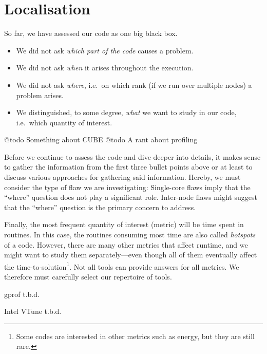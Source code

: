 \chapter{Localisation}
\label{capter:high-level:localisation}

So far, we have assessed our code as one big black box.

\begin{itemize}
  \item We did not ask \emph{which part of the code} causes a problem. 
  \item We did not ask \emph{when} it arises throughout the execution.
  \item We did not ask \emph{where}, i.e.~on which rank (if we run over multiple
  nodes) a problem arises.
  \item We distinguished, to some degree, \emph{what} we want to study in our
  code, i.e.~which quantity of interest.
\end{itemize}


@todo Something about CUBE
@todo A rant about profiling

\noindent
Before we continue to assess the code and dive deeper into details, it makes sense to gather the information from the first three bullet points above or at least to discuss various approaches for gathering said information.
Hereby, we must consider the type of flaw we are investigating:
Single-core flaws imply that the ``where'' question does not play a significant
role.
Inter-node flaws might suggest that the ``where'' question is the primary
concern to address.

Finally, the most frequent quantity of interest (metric) will be time spent in routines.
In this case, the routines consuming most time are also called \emph{hotspots} of a code.
However, there are many other metrics that affect runtime, and we might want to study them separately—even though all of them eventually affect the time-to-solution\footnote{Some codes are interested in other metrics such as energy, but they are still rare.}.
Not all tools can provide answers for all metrics.
We therefore must carefully select our repertoire of tools.

\begin{instructions}{gprof}
t.b.d.
\end{instructions}


\begin{instructions}{Intel VTune}
t.b.d.
\end{instructions}

